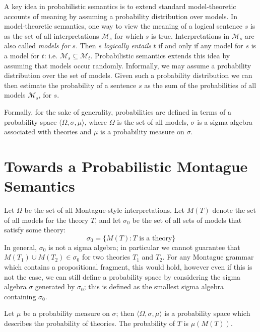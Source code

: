 \documentclass{svmult}
\begin{document}
A key idea in probabilistic semantics is to extend standard
model-theoretic accounts of meaning by assuming a probability
distribution over models.  In model-theoretic semantics, one way to
view the meaning of a logical sentence $s$ is as the set of all
interpretations $\mathcal{M}_s$ for which $s$ is true. Interpretations
in $\mathcal{M}_s$ are also called {\em models for\/} $s$. Then $s$
{\em logically entails\/} $t$ if and only if any model for $s$ is a
model for $t$: i.e. $\mathcal{M}_s \subseteq
\mathcal{M}_t$. Probabilistic semantics extends this idea by assuming
that models occur randomly. Informally, we may assume a probability
distribution over the set of models. Given such a probability
distribution we can then estimate the probability of a sentence $s$ as
the sum of the probabilities of all models $\mathcal{M}_s$, for $s$.

Formally, for the sake of generality, probabilities are defined in
terms of a probability space $\langle \Omega, \sigma, \mu\rangle$,
where $\Omega$ is the set of all models, $\sigma$ is a sigma algebra
associated with theories and $\mu$ is a probability measure on
$\sigma$.

\section{Towards a Probabilistic Montague Semantics}

Let $\Omega$ be the set of all Montague-style interpretations. Let
$M(T)$ denote the set of all models for the theory $T$, and let
$\sigma_0$ be the set of all sets of models that satisfy some theory:
$$\sigma_0 = \{M(T) : T\text{ is a theory}\}$$
In general, $\sigma_0$ is not a sigma algebra; in particular we cannot
guarantee that $M(T_1)\cup M(T_2) \in \sigma_0$ for two theories $T_1$
and $T_2$. For any Montague grammar which contains a propositional
fragment, this would hold, however even if this is not the case, we
can still define a probability space by considering the sigma algebra
$\sigma$ generated by $\sigma_0$; this is defined as the smallest
sigma algebra containing $\sigma_0$.

Let $\mu$ be a probability measure on $\sigma$; then
$\langle\Omega,\sigma,\mu\rangle$ is a probability space which
describes the probability of theories. The probability of $T$ is
$\mu(M(T))$.

\end{document}
